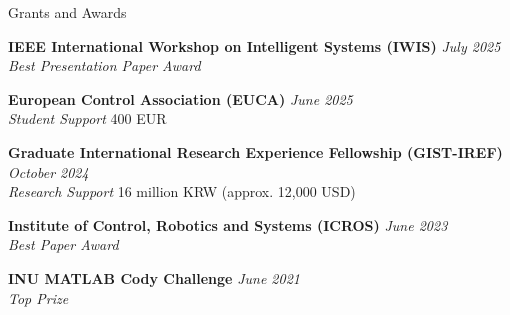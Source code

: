 \documentclass{resume} %
\begin{document}
\begin{rSection}{Grants and Awards}

\small{

    {\bf IEEE International Workshop on Intelligent Systems (IWIS)} 
        \hfill 
        {\em July 2025} 
        \\
        {\textit {Best Presentation Paper Award}} 

    {\bf European Control Association (EUCA) } 
        \hfill 
        {\em June 2025} 
        \\
        {\textit {Student Support}}
        \hfill 
        {400 EUR}

    {\bf Graduate International Research Experience Fellowship (GIST-IREF)} 
        \hfill 
        {\em October 2024} 
        \\
        {\textit {Research Support}}
        \hfill 
        {16 million KRW (approx. 12,000 USD)}
        
    {\bf Institute of Control, Robotics and Systems (ICROS)} 
        \hfill 
        {\em June 2023} 
        \\
        {\textit {Best Paper Award}} 

    {\bf INU MATLAB Cody Challenge} 
        \hfill 
        {\em June 2021} 
        \\
        {\textit {Top Prize}} 

}

\end{rSection}
\end{document}
